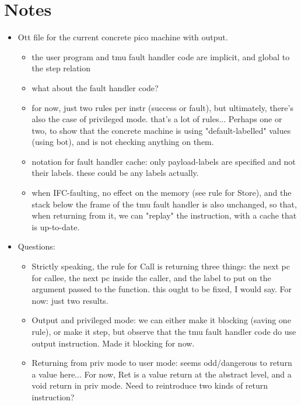 \documentclass{scrartcl}
\begin{document}
\section*{Notes}

\begin{itemize}
\item Ott file for the current concrete pico machine with output.
  \begin{itemize}
    \item the user program and tmu fault handler code are implicit,
      and global to the step relation
    \item what about the fault handler code? 
    \item for now, just two rules per instr (success or fault), but
      ultimately, there's also the case of privileged mode.
      that's a lot of rules...
      Perhaps one or two, to show that the concrete machine is 
      using "default-labelled" values (using bot), and is not checking
      anything on them.
    \item notation for fault handler cache: only payload-labels are
      specified and not their labels. these could be any labels actually.
    \item when IFC-faulting, no effect on the memory (see rule for
      Store), and the stack below the frame of the tmu fault handler
      is also unchanged, so that, when returning from it, we can
      "replay" the instruction, with a cache that is up-to-date.
  \end{itemize}
\item Questions:
  \begin{itemize}
    \item Strictly speaking, the rule for Call is returning three
      things: the next pc for callee, the next pc inside the caller,
      and the label to put on the argument passed to the function.
      this ought to be fixed, I would say. For now: just two results.
    \item Output and privileged mode: we can either make it blocking
      (saving one rule), or make it step, but observe that the tmu
      fault handler code do use output instruction. Made it blocking
      for now.
    \item Returning from priv mode to user mode: seems odd/dangerous
      to return a value here... For now, Ret is a value return at the
      abstract level, and a void return in priv mode. Need to
      reintroduce two kinds of return instruction?
  \end{itemize}
\end{itemize}
\end{document}
